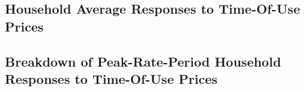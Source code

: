 \subsection{Household Average Responses to Time-Of-Use Prices}
\label{Subsection:Household-Average-Responses-to-Time-Of-Use-Prices}



\subsection{Breakdown of Peak-Rate-Period Household Responses to Time-Of-Use Prices}
\label{Subsection:Breakdown-of-Responses-to-Time-Of-Use-Prices}

